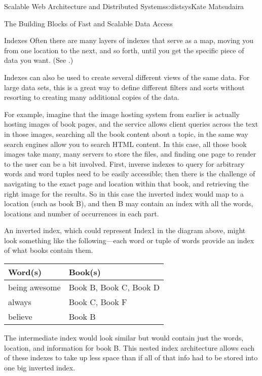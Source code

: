 \begin{aosachapter}{Scalable Web Architecture and Distributed Systems}{s:distsys}{Kate Matsudaira}
\begin{aosasect1}{The Building Blocks of Fast and Scalable Data Access}
\begin{aosasect2}{Indexes}
Often there are many layers of indexes that serve as a
map, moving you from one location to the next, and so forth, until
you get the specific piece of data you want. (See .)


Indexes can also be used to create several different views of the same
data. For large data sets, this is a great way to define different
filters and sorts without resorting to creating many additional copies
of the data.

For example, imagine that the image hosting system from earlier is
actually hosting images of book pages, and the service allows client
queries across the text in those images, searching all the book
content about a topic, in the same way search engines allow you to
search HTML content. In this case, all those book images take many,
many servers to store the files, and finding one page to render to the
user can be a bit involved. First, inverse indexes to
query for arbitrary words and word tuples need to be easily
accessible; then there is the challenge of navigating to the exact
page and location within that book, and retrieving the right image for
the results. So in this case the inverted index would map to a
location (such as book B), and then B may contain an index with all
the words, locations and number of occurrences in each part.

An inverted index, which could represent Index1 in the diagram above,
might look something like the following---each word or tuple of words
provide an index of what books contain them.

\vspace{10pt}
\begin{tabular}{ll}
\hline
Word(s) & Book(s) \\
\hline
being awesome & Book B, Book C, Book D \\
always & Book C, Book F \\
believe & Book B \\
\hline
\end{tabular}
\vspace{10pt}

The intermediate index would look similar but would contain just the
words, location, and information for book B. This nested index
architecture allows each of these indexes to take up less space than
if all of that info had to be stored into one big inverted index.


\end{aosasect2}
\end{aosasect1}
\end{aosachapter}
